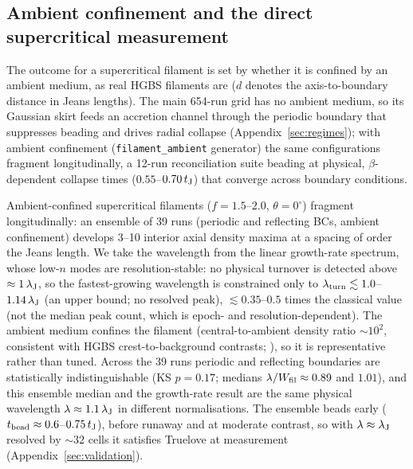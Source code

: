 \documentclass[usenatbib,twoside,twocolumn]{mnras}
\begin{document}
\subsection{Ambient confinement and the direct supercritical measurement}
\label{sec:modecompetition}

The outcome for a supercritical filament is set by whether it is confined by an ambient medium, as real HGBS filaments are ($d$ denotes the axis-to-boundary distance in Jeans lengths). The main 654-run grid has no ambient medium, so its Gaussian skirt feeds an accretion channel through the periodic boundary that suppresses beading and drives radial collapse (Appendix~\ref{sec:regimes}); with ambient confinement (\texttt{filament\_ambient} generator) the same configurations fragment longitudinally, a 12-run reconciliation suite beading at physical, $\beta$-dependent collapse times ($0.55$--$0.70\,t_{\rm J}$) that converge across boundary conditions.

Ambient-confined supercritical filaments ($f=1.5$--$2.0$, $\theta=0^\circ$) fragment longitudinally: an ensemble of 39 runs (periodic and reflecting BCs, ambient confinement) develops 3--10 interior axial density maxima at a spacing of order the Jeans length. We take the wavelength from the linear growth-rate spectrum, whose low-$n$ modes are resolution-stable: no physical turnover is detected above $\approx1\,\lambda_{\rm J}$, so the fastest-growing wavelength is constrained only to $\lambda_{\rm turn}\lesssim1.0$--$1.14\,\lambda_{\rm J}$ (an upper bound; no resolved peak), $\lesssim0.35$--$0.5$ times the classical value (not the median peak count, which is epoch- and resolution-dependent). The ambient medium confines the filament (central-to-ambient density ratio $\sim10^2$, consistent with HGBS crest-to-background contrasts; \citealt{Arzoumanian2019}), so it is representative rather than tuned. Across the 39 runs periodic and reflecting boundaries are statistically indistinguishable (KS $p=0.17$; medians $\lambda/W_{\rm fil}\approx0.89$ and $1.01$), and this ensemble median and the growth-rate result are the same physical wavelength $\lambda\approx1.1\,\lambda_{\rm J}$ in different normalisations. The ensemble beads early ($t_{\rm bead}\approx0.6$--$0.75\,t_{\rm J}$), before runaway and at moderate contrast, so with $\lambda\approx\lambda_{\rm J}$ resolved by ${\sim}32$ cells it satisfies Truelove at measurement (Appendix~\ref{sec:validation}).
\end{document}
